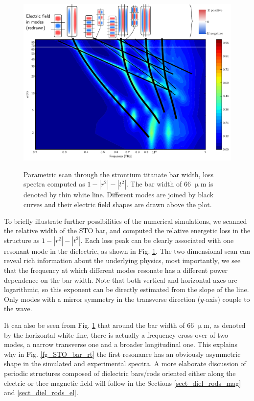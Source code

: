 \begin{figure}[ht] \centering \caption{Parametric scan through the strontium titanate bar width, loss spectra computed as $1-|r^2|-|t^2|$. The bar width of 66 $\upmu$m is denoted by thin white line. Different modes are joined by black curves and their electric field shapes are drawn above the plot.} \includegraphics[width=\textwidth]{img/STOBarC_modes2.pdf} \label{fg_STO_bar_modes} \end{figure}
To briefly illustrate further possibilities of the numerical simulations, we scanned the relative width of the STO bar, and computed the relative energetic loss in the structure as $1-|r^2|-|t^2|$. Each loss peak can be clearly associated with one resonant mode in the dielectric, as shown in Fig. \ref{fg_STO_bar_modes}. The two-dimensional scan can reveal rich information about the underlying physics, most importantly, we see that the frequency at which different modes resonate has a different power dependence on the bar width. Note that both vertical and horizontal axes are logarithmic, so this exponent can be directly estimated from the slope of the line. Only modes with a mirror symmetry in the transverse direction ($y$-axis) couple to the wave.

It can also be seen from Fig. \ref{fg_STO_bar_modes} that around the bar width of 66 $\upmu$m, as denoted by the horizontal white line, there is actually a frequency cross-over of two modes, a narrow transverse one and a broader longitudinal one. This explains why in Fig. \ref{fg_STO_bar_rt} the first resonance has an obviously asymmetric shape in the simulated and experimental spectra.  %
A more elaborate discussion of periodic structures composed of dielectric bars/rods oriented either along the electric or thee magnetic field will follow in the Sections \ref{sect_diel_rods_mag} and \ref{sect_diel_rods_el}.
